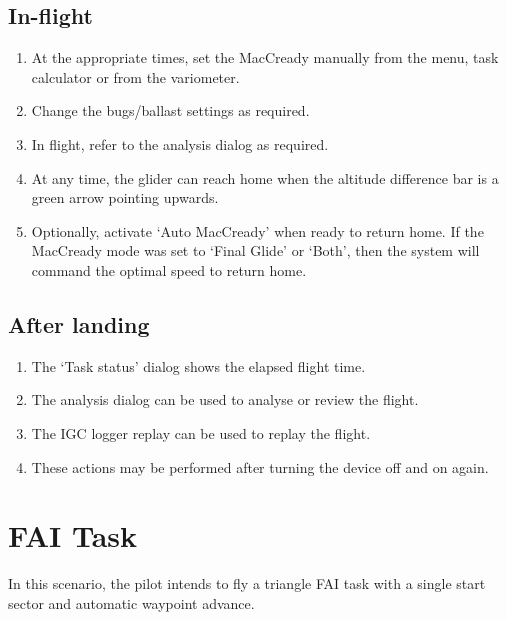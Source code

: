 \documentclass[a4paper,12pt]{refrep}
\begin{document}
\subsection*{In-flight}
\begin{enumerate}
\item At the appropriate times, set the MacCready manually from the menu,
  task calculator or from the variometer.
\item Change the bugs/ballast settings as required.
\item In flight, refer to the analysis dialog as required. 
\item At any time, the glider can reach home when the altitude difference
  bar is a green arrow pointing upwards.
\item Optionally, activate `Auto MacCready' when ready to return home.
If the MacCready mode was set to `Final Glide' or `Both', then the
system will command the optimal speed to return home.
\end{enumerate}

\subsection*{After landing}
\begin{enumerate}
\item The `Task status' dialog shows the elapsed flight time.
\item The analysis dialog can be used to analyse or review the flight.
\item The IGC logger replay can be used to replay the flight.
\item These actions may be performed after turning the device off and 
  on again. 
\end{enumerate}

\section{FAI Task}\label{sec:fai-task}

In this scenario, the pilot intends to fly a triangle FAI task with a
single start sector and automatic waypoint advance.
\end{document}
